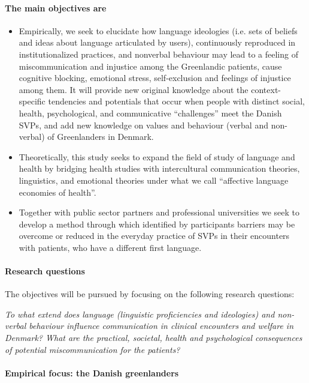 \documentclass[twocolumn, issue, rga, authordate]{jote-new-article}
\begin{document}
\paragraph{The main objectives are}

\begin{itemize}
\item Empirically, we seek to elucidate how language ideologies (i.e. sets of beliefs and ideas about language articulated by users), continuously reproduced in institutionalized practices, and nonverbal behaviour may lead to a feeling of miscommunication and injustice among the Greenlandic patients, cause cognitive blocking, emotional stress, self-exclusion and feelings of injustice among them. It will provide new original knowledge about the context-specific tendencies and potentials that occur when people with distinct social, health, psychological, and communicative ``challenges'' meet the Danish SVPs, and add new knowledge on values and behaviour (verbal and non-verbal) of Greenlanders in Denmark.

\item Theoretically, this study seeks to expand the field of study of language and health by bridging health studies with intercultural communication theories, linguistics, and emotional theories under what we call ``affective language economies of health''.

\item Together with public sector partners and professional universities we seek to develop a method through which identified by participants barriers may be overcome or reduced in the everyday practice of SVPs in their encounters with patients, who have a different first language.

        \end{itemize}

\paragraph{Research questions}

The objectives will be pursued by focusing on the following research questions:

\emph{To what extend does language (linguistic proficiencies and ideologies) and non-verbal behaviour influence communication in clinical encounters and welfare in Denmark? What are the practical, societal, health and psychological consequences of potential miscommunication for the patients?}


\paragraph{Empirical focus: the Danish greenlanders}
\end{document}
